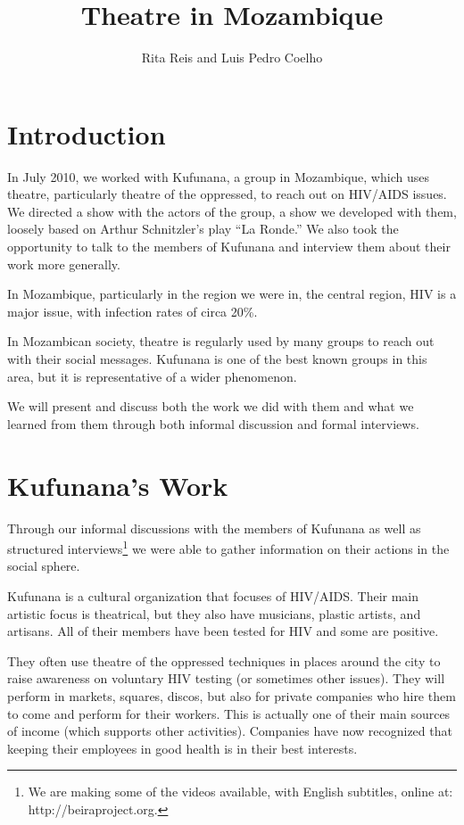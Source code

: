 \documentclass[article,twocolumn]{memoir}
\title{Theatre in Mozambique}
\author{Rita Reis and Luis Pedro Coelho}
\begin{document}
\maketitle

\chapter{Introduction}
In July 2010, we worked with Kufunana, a group in Mozambique, which uses
theatre, particularly theatre of the oppressed, to reach out on HIV/AIDS
issues. We directed a show with the actors of the group, a show we developed
with them, loosely based on Arthur Schnitzler's play ``La Ronde.'' We also took
the opportunity to talk to the members of Kufunana and interview them about
their work more generally.

In Mozambique, particularly in the region we were in, the central region, HIV
is a major issue, with infection rates of circa 20\%.

In Mozambican society, theatre is regularly used by many groups to reach out
with their social messages. Kufunana is one of the best known groups in this
area, but it is representative of a wider phenomenon.

We will present and discuss both the work we did with them and what we learned
from them through both informal discussion and formal interviews.

\chapter{Kufunana's Work}

Through our informal discussions with the members of Kufunana as well as
structured interviews\footnote{We are making some of the videos available, with
English subtitles, online at: http://beiraproject.org.} we were able to gather
information on their actions in the social sphere.

Kufunana is a cultural organization that focuses of HIV/AIDS. Their main
artistic focus is theatrical, but they also have musicians, plastic artists,
and artisans. All of their members have been tested for HIV and some are
positive.

They often use theatre of the oppressed techniques in places around the city to
raise awareness on voluntary HIV testing (or sometimes other issues). They will
perform in markets, squares, discos, but also for private companies who hire
them to come and perform for their workers. This is actually one of their main
sources of income (which supports other activities). Companies have now
recognized that keeping their employees in good health is in their best
interests.
\end{document}
